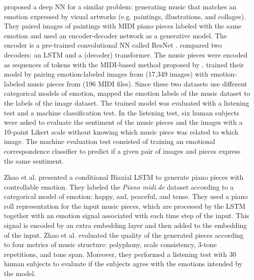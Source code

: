 \citet{tan2020automated} proposed a deep NN for a similar problem: generating music that matches an emotion expressed by visual artworks (e.g. paintings, illustrations, and collages). They paired images of paintings with MIDI piano pieces labeled with the same emotion and used an encoder-decoder network as a generative model. The encoder is a pre-trained convolutional NN called ResNet \cite{he2016deep}. \citet{tan2020automated} compared two decoders: an LSTM and a (decoder) transformer. The music pieces were encoded as sequences of tokens with the MIDI-based method proposed by \citet{oore2017learning}. \citet{tan2020automated} trained their model by pairing emotion-labeled images from \citet{you2016building} (17,349 images) with emotion-labeled music pieces from \citet{panda2013multi} (196 MIDI files). Since these two datasets use different categorical models of emotion, \citet{tan2020automated} mapped the emotion labels of the music dataset to the labels of the image dataset. The trained model was evaluated with a listening test and a machine classification test. In the listening test, six human subjects were asked to evaluate the sentiment of the music pieces and the images with a 10-point Likert scale without knowing which music piece was related to which image. The machine evaluation test consisted of training an emotional correspondence classifier to predict if a given pair of images and pieces express the same sentiment.

Zhao et al. \cite{zhao2019emotional} presented a conditional Biaxial LSTM \cite{johnson2017generating} to generate piano pieces with controllable emotion. They labeled the \textit{Piano midi.de} dataset according to a categorical model of emotion: happy, sad, peaceful, and tense. They used a piano roll representation for the input music pieces, which are processed by the LSTM together with an emotion signal associated with each time step of the input. This signal is encoded by an extra embedding layer and then added to the embedding of the input. Zhao et al. \cite{zhao2019emotional} evaluated the quality of the generated pieces according to four metrics of music structure: polyphony, scale consistency, 3-tone repetitions, and tone span. Moreover, they performed a listening test with 30 human subjects to evaluate if the subjects agree with the emotions intended by the model.

